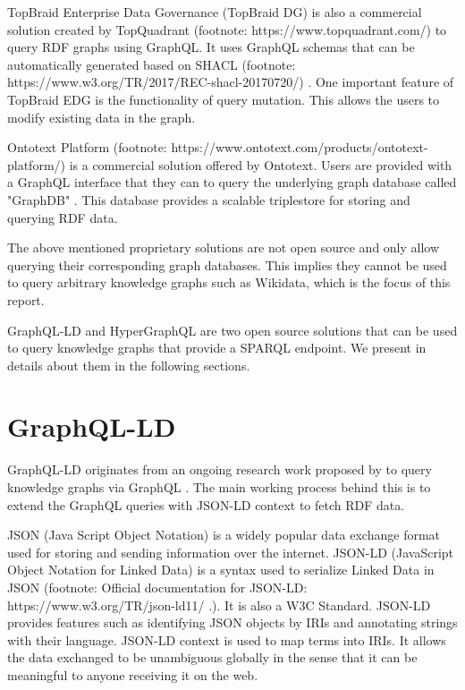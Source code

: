 TopBraid Enterprise Data Governance (TopBraid DG) is also a commercial solution created by TopQuadrant (footnote: https://www.topquadrant.com/) to query RDF graphs using GraphQL. It uses GraphQL schemas that can be automatically generated based on SHACL (footnote: https://www.w3.org/TR/2017/REC-shacl-20170720/) \cite{Taelman2019}. One important feature of TopBraid EDG is the functionality of query mutation. This allows the users to modify existing data in the graph.

Ontotext Platform (footnote: https://www.ontotext.com/products/ontotext-platform/) is a commercial solution offered by Ontotext. Users are provided with a GraphQL interface that they can to query the underlying graph database called "GraphDB" \cite{Angele2022}. This database provides a scalable triplestore for storing and querying RDF data.

The above mentioned proprietary solutions are not open source and only allow querying their corresponding graph databases. This implies they cannot be used to query arbitrary knowledge graphs such as Wikidata, which is the focus of this report.

GraphQL-LD and HyperGraphQL are two open source solutions that can be used to query knowledge graphs that provide a SPARQL endpoint. We present in details about them in the following sections.

\section{GraphQL-LD}

GraphQL-LD originates from an ongoing research work proposed by \citeauthor{Taelman2018} to query knowledge graphs via GraphQL \cite{Taelman2018}. The main working process behind this is to extend the GraphQL queries with JSON-LD context to fetch RDF data. 

JSON (Java Script Object Notation) is a widely popular data exchange format used for storing and sending information over the internet. JSON-LD (JavaScript Object Notation for Linked Data) is a syntax used to serialize Linked Data in JSON (footnote: Official documentation for JSON-LD: https://www.w3.org/TR/json-ld11/ .). It is also a W3C Standard. JSON-LD provides features such as identifying JSON objects by IRIs and annotating strings with their language. JSON-LD context is used to map terms into IRIs. It allows the data exchanged to be unambiguous globally in the sense that it can be meaningful to anyone receiving it on the web.   

